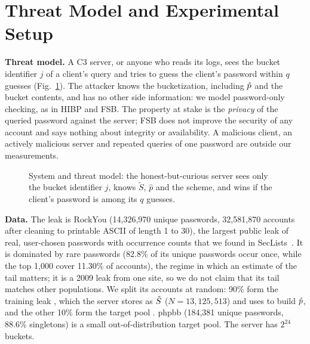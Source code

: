 \section{Threat Model and Experimental Setup}

\textbf{Threat model.} A C3 server, or anyone who reads its logs, sees the bucket identifier $j$ of a client's query and tries to guess the client's password within $q$ guesses (Fig.~\ref{fig:system}). The attacker knows the bucketization, including $\hat p$ and the bucket contents, and has no other side information: we model password-only checking, as in HIBP and FSB. The property at stake is the \emph{privacy} of the queried password against the server; FSB does not improve the security of any account and says nothing about integrity or availability. A malicious client, an actively malicious server and repeated queries of one password are outside our measurements.

\begin{figure}[t]
\centering
{}
\caption{System and threat model: the honest-but-curious server sees only the bucket identifier $j$, knows $\tilde S$, $\hat p$ and the scheme, and wins if the client's password is among its $q$ guesses.}
\label{fig:system}
\end{figure}

\textbf{Data.} The leak is RockYou (14,326,970 unique passwords, 32,581,870 accounts after cleaning to printable ASCII of length 1 to 30), the largest public leak of real, user-chosen passwords with occurrence counts that we found in SecLists~\cite{miessler}. It is dominated by rare passwords (82.8\% of its unique passwords occur once, while the top 1,000 cover 11.30\% of accounts), the regime in which an estimate of the tail matters; it is a 2009 leak from one site, so we do not claim that its tail matches other populations. We split its accounts at random: 90\% form the training leak \Atrain, which the server stores as $\tilde S$ ($N=13{,}125{,}513$) and uses to build $\hat p$, and the other 10\% form the target pool \Atest. phpbb (184,381 unique passwords, 88.6\% singletons) is a small out-of-distribution target pool. The server has $2^{24}$ buckets.

